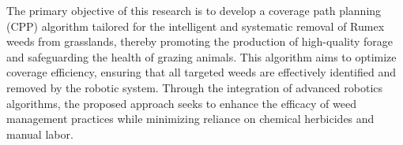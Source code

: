 \vspace*{6mm} 

The primary objective of this research is to develop a coverage path planning (CPP) algorithm tailored for the intelligent and systematic removal of Rumex weeds from grasslands, thereby promoting the production of high-quality forage and safeguarding the health of grazing animals. This algorithm aims to optimize coverage efficiency, ensuring that all targeted weeds are effectively identified and removed by the robotic system. Through the integration of advanced robotics algorithms, the proposed approach seeks to enhance the efficacy of weed management practices while minimizing reliance on chemical herbicides and manual labor.


\vspace*{6mm} 

